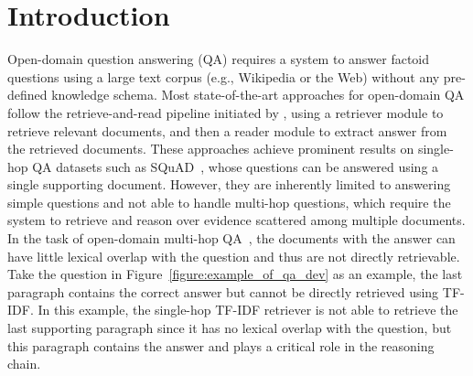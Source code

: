 \documentclass[sigconf]{acmart}
\begin{document}



\maketitle



\section{Introduction}

\setlength{\abovedisplayskip}{3pt}
\setlength{\abovedisplayshortskip}{3pt}
\setlength{\belowdisplayskip}{3pt}
\setlength{\belowdisplayshortskip}{3pt}
\setlength{\jot}{2pt}
\setlength{\floatsep}{1ex}
\setlength{\textfloatsep}{1ex}
\setlength{\intextsep}{1ex}





Open-domain question answering (QA) requires a system to answer factoid questions using a large text corpus (e.g., Wikipedia or the Web) without any pre-defined knowledge schema. Most state-of-the-art approaches for open-domain QA follow the retrieve-and-read pipeline initiated by \citet{chen-etal-2017-reading}, using a retriever module to retrieve relevant documents, and then a reader module to extract answer from the retrieved documents. These approaches achieve prominent results on single-hop QA datasets such as SQuAD~\cite{rajpurkar-etal-2016-squad}, whose questions can be answered using a single supporting document. However, they are inherently limited to answering simple questions and not able to handle multi-hop questions, which require the system to retrieve and reason over evidence scattered among multiple documents. In the task of open-domain multi-hop QA~\cite{yang-etal-2018-hotpotqa}, the documents with the answer can have little lexical overlap with the question and thus are not directly retrievable. Take the question in Figure~\ref{figure:example_of_qa_dev} as an example, the last paragraph contains the correct answer but cannot be directly retrieved using TF-IDF. In this example, the single-hop TF-IDF retriever is not able to retrieve the last supporting paragraph since it has no lexical overlap with the question, but this paragraph contains the answer and plays a critical role in the reasoning chain.
\end{document}
